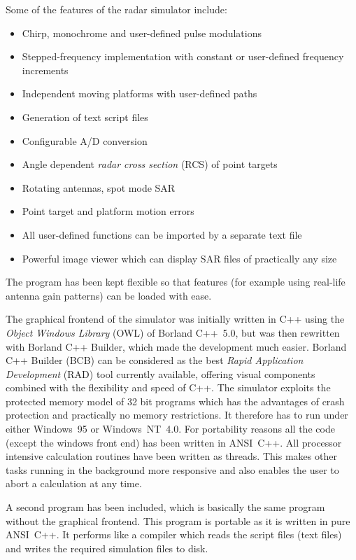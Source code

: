 Some of the features of the radar simulator include:

\begin{itemize}
\item  Chirp, monochrome and user-defined pulse modulations

\item  Stepped-frequency implementation with constant or user-defined
frequency increments

\item  Independent moving platforms with user-defined paths

\item  Generation of text script files

\item  Configurable A/D conversion

\item  Angle dependent \textit{radar cross section} (RCS) of point targets

\item  Rotating antennas, spot mode SAR

\item  Point target and platform motion errors

\item  All user-defined functions can be imported by a separate text file

\item  Powerful image viewer which can display SAR files of practically any
size
\end{itemize}

The program has been kept flexible so that features (for example using
real-life antenna gain patterns) can be loaded with ease.

The graphical frontend of the simulator was initially written in C++ using
the \textit{Object Windows Library }(OWL) of Borland C++~5.0, but was then
rewritten with Borland C++ Builder, which made the development much easier.
Borland C++ Builder (BCB) can be considered as the best \textit{Rapid
Application Development }(RAD) tool currently available, offering visual
components combined with the flexibility and speed of C++. The simulator
exploits the protected memory model of 32 bit programs which has the
advantages of crash protection and practically no memory restrictions. It
therefore has to run under either Windows~95 or Windows~NT~4.0. For
portability reasons all the code (except the windows front end) has been
written in ANSI~C++. All processor intensive calculation routines have been
written as threads. This makes other tasks running in the background more
responsive and also enables the user to abort a calculation at any time.

A second program has been included, which is basically the same program
without the graphical frontend. This program is portable as it is written in
pure ANSI~C++. It performs like a compiler which reads the script files
(text files) and writes the required simulation files to disk.
